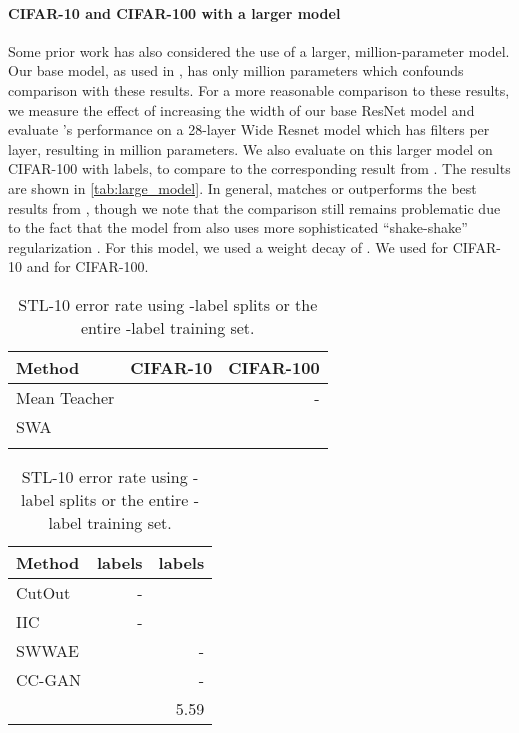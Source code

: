 \documentclass{article}
\begin{document}
\paragraph{CIFAR-10 and CIFAR-100 with a larger model} Some prior work \cite{tarvainen2017weight,athiwaratkun2018improving} has also considered the use of a larger,  million-parameter model.
Our base model, as used in \cite{oliver2018realistic}, has only  million parameters which confounds comparison with these results.
For a more reasonable comparison to these results, we measure the effect of increasing the width of our base ResNet model and evaluate 's performance on a 28-layer Wide Resnet model which has  filters per layer, resulting in  million parameters.
We also evaluate  on this larger model on CIFAR-100 with  labels, to compare to the corresponding result from \cite{athiwaratkun2018improving}.
The results are shown in \cref{tab:large_model}.
In general,  matches or outperforms the best results from \cite{athiwaratkun2018improving}, though we note that the comparison still remains problematic due to the fact that the model from \cite{tarvainen2017weight,athiwaratkun2018improving} also uses more sophisticated ``shake-shake'' regularization \cite{gastaldi2017shake}.
For this model, we used a weight decay of .
We used  for CIFAR-10 and  for CIFAR-100.

\begin{table}
  \parbox{.5\linewidth}{
    \centering
    \small
    \begin{tabular}{lrr}
    \toprule
      Method & CIFAR-10 & CIFAR-100 \\
      \midrule
      Mean Teacher \cite{tarvainen2017weight} &  & -\\
      SWA \cite{athiwaratkun2018improving}    &  &   \\
      \midrule
          &  &  \\
    \bottomrule
    \end{tabular}
    \vskip 0.1in
    \caption{CIFAR-10 and CIFAR-100 error rate (with  and  labels respectively) with larger models ( million parameters).}
    \label{tab:large_model}
  }
  \hfill
  \parbox{.46\linewidth}{
    \centering
    \small
    \begin{tabular}{lrr}
    \toprule
      Method &  labels &  labels \\
      \midrule
      CutOut \cite{devries2017improved} & - &  \\
      IIC \cite{ji2018invariant} & -  &  \\
      SWWAE \cite{zhao2015stacked} &  & - \\
      CC-GAN \cite{denton2016semi} &  & - \\
      \midrule
          &  & 5.59 \\
    \bottomrule
    \end{tabular}
    \vskip 0.1in
    \caption{STL-10 error rate using -label splits or the entire -label training set.}
    \label{tab:stl10}
  }
  \vskip -0.2in
\end{table}
\end{document}
